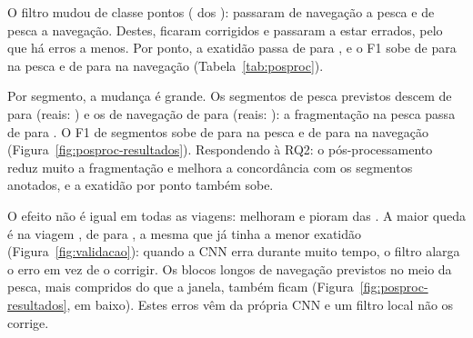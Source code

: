 \documentclass{article}
\newcommand{\revtext}[2]{{\color{#1}#2}}
\begin{document}
\revtext{rev059}{O filtro mudou de classe \resPpMudam{} pontos (\resPpPercMudam{} dos \resPpAntesPontos{}): \resPpNavParaPesca{} passaram de navegação a pesca e \resPpPescaParaNav{} de pesca a navegação. Destes, \resPpCorrigidos{} ficaram corrigidos e \resPpEstragados{} passaram a estar errados, pelo que há \resPpErrosMenos{} erros a menos. Por ponto, a exatidão passa de \resPpAntesAcc{} para \resPpDepoisAcc{}, e o F1 sobe de \resPpAntesPescaF{} para \resPpDepoisPescaF{} na pesca e de \resPpAntesNavF{} para \resPpDepoisNavF{} na navegação (Tabela~\ref{tab:posproc}).

Por segmento, a mudança é grande. Os segmentos de pesca previstos descem de \resPpASegPescaNPred{} para \resPpDSegPescaNPred{} (reais: \resPpASegPescaNRef{}) e os de navegação de \resPpASegNavNPred{} para \resPpDSegNavNPred{} (reais: \resPpASegNavNRef{}): a fragmentação na pesca passa de \resPpASegPescaFrag{} para \resPpDSegPescaFrag{}. O F1 de segmentos sobe de \resPpASegPescaF{} para \resPpDSegPescaF{} na pesca e de \resPpASegNavF{} para \resPpDSegNavF{} na navegação (Figura~\ref{fig:posproc-resultados}). Respondendo à RQ2: o pós-processamento reduz muito a fragmentação e melhora a concordância com os segmentos anotados, e a exatidão por ponto também sobe.

O efeito não é igual em todas as viagens: melhoram \resPpViagMelhoram{} e pioram \resPpViagPioram{} das \resPpNViagens{}. A maior queda é na viagem \resPpPiorQuedaViagem{}, de \resPpPiorQuedaAntes{} para \resPpPiorQuedaDepois{}, a mesma que já tinha a menor exatidão (Figura~\ref{fig:validacao}): quando a CNN erra durante muito tempo, o filtro alarga o erro em vez de o corrigir. Os blocos longos de navegação previstos no meio da pesca, mais compridos do que a janela, também ficam (Figura~\ref{fig:posproc-resultados}, em baixo). Estes erros vêm da própria CNN e um filtro local não os corrige.}
\end{document}
